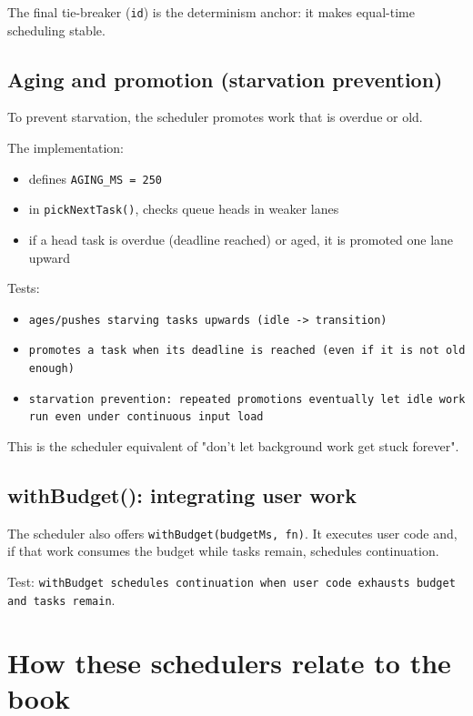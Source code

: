 The final tie-breaker (\texttt{id}) is the determinism anchor: it makes equal-time scheduling stable.

\subsection{Aging and promotion (starvation prevention)}

To prevent starvation, the scheduler promotes work that is overdue or old.

The implementation:

\begin{itemize}
  \item defines \texttt{AGING\_MS = 250}
  \item in \texttt{pickNextTask()}, checks queue heads in weaker lanes
  \item if a head task is overdue (deadline reached) or aged, it is promoted one lane upward
\end{itemize}

Tests:

\begin{itemize}
  \item \texttt{ages/pushes starving tasks upwards (idle -> transition)}
  \item \texttt{promotes a task when its deadline is reached (even if it is not old enough)}
  \item \texttt{starvation prevention: repeated promotions eventually let idle work run even under continuous input load}
\end{itemize}

This is the scheduler equivalent of "don’t let background work get stuck forever".

\subsection{withBudget(): integrating user work}

The scheduler also offers \texttt{withBudget(budgetMs, fn)}.
It executes user code and, if that work consumes the budget while tasks remain, schedules continuation.

Test: \texttt{withBudget schedules continuation when user code exhausts budget and tasks remain}.

\section{How these schedulers relate to the book}


